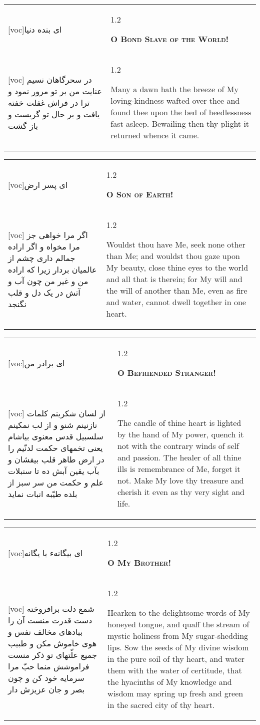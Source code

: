 \documentclass[11pt]{article}
\makeatletter
\newenvironment{orig}
  {\begin{farsi}[voc]}
  {\end{farsi}}
\newenvironment{trans}
  {\Large\begin{spacing}{1.2}\raggedright}
  {\end{spacing}}
\newenvironment{word}
  {\begin{tabular}[t]{p{2.75in}@{\hspace{3em}}p{2.75in}}}
  {\end{tabular}}
\newcommand{\ayat}[2]{\begin{orig}#1\end{orig} & \begin{trans}#2\end{trans}}
\newcommand{\heading}[2]{\textsc{\textbf{#1}} %
}
\makeatother
\begin{document}
\begin{word}
\ayat{ای بنده دنيا}{\heading{O Bond Slave of the World!}{}} \\ \ayat{
در سحرگاهان نسيم عنايت من بر تو مرور نمود و ترا در فراش غفلت خفته يافت و بر حال تو گريست و باز گشت
}{
  Many a dawn hath the breeze of My loving-kindness wafted over thee and found
  thee upon the bed of heedlessness fast asleep. Bewailing then thy plight it
  returned whence it came.
}
\end{word}

\pagebreak

\begin{word}
\ayat{ای پسر ارض}{\heading{O Son of Earth!}{}} \\ \ayat{
اگر مرا خواهی جز مرا مخواه و اگر اراده جمالم داری چشم از عالميان بردار زيرا که اراده من و غير من چون آب و آتش در يک دل و قلب نگنجد
}{
  Wouldst thou have Me, seek none other than Me; and wouldst thou gaze upon My
  beauty, close thine eyes to the world and all that is therein; for My will
  and the will of another than Me, even as fire and water, cannot dwell
  together in one heart.
}
\end{word}

\pagebreak

\begin{word}
\ayat{ای برادر من}{\heading{O Befriended Stranger!}{}} \\ \ayat{
از لسان شکرينم کلمات نازنينم شنو و از لب نمکينم سلسبيل قدس معنوی بياشام يعنی تخمهای حکمت لدنّيم را در ارض طاهر قلب بيفشان و بآب يقين آبش ده تا سنبلات علم و حکمت من سر سبز از بلده طيّبه انبات نمايد
}{
  The candle of thine heart is lighted by the hand of My power, quench it not
  with the contrary winds of self and passion. The healer of all thine ills is
  remembrance of Me, forget it not. Make My love thy treasure and cherish it
  even as thy very sight and life.
}
\end{word}

\pagebreak

\begin{word}
\ayat{ای بيگانهء با يگانه}{\heading{O My Brother!}{}} \\ \ayat{
شمع دلت برافروخته دست قدرت منست آن را ببادهای مخالف نفس و هوی خاموش مکن و طبيب جميع علّتهای تو ذکر منست فراموشش منما
حبّ مرا سرمايه خود کن و چون بصر و جان عزيزش دار
}{
  Hearken to the delightsome words of My honeyed tongue, and quaff the stream
  of mystic holiness from My sugar-shedding lips. Sow the seeds of My divine
  wisdom in the pure soil of thy heart, and water them with the water of
  certitude, that the hyacinths of My knowledge and wisdom may spring up fresh
  and green in the sacred city of thy heart.
}
\end{word}
\end{document}
